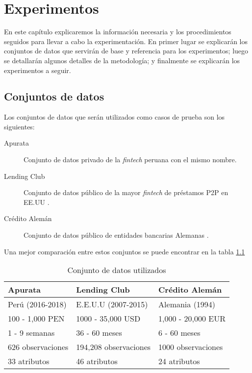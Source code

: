 \chapter{Experimentos}


En este capítulo explicaremos la información necesaria y los procedimientos seguidos para llevar a cabo la experimentación. En primer lugar se explicarán los conjuntos de datos que servirán de base y referencia para los experimentos; luego se detallarán algunos detalles de la metodología; y finalmente se explicarán los experimentos a seguir.

\section{Conjuntos de datos}

Los conjuntos de datos que serán utilizados como casos de prueba son los siguientes:

\begin{description}
	\item[Apurata] Conjunto de datos privado de la \textit{fintech} peruana con el mismo nombre.
	\item[Lending Club] Conjunto de datos público de la mayor \textit{fintech} de préstamos \ac{P2P} en EE.UU \citep{dataset:lending-club}.
	\item[Crédito Alemán] Conjunto de datos público de entidades bancarias Alemanas \citep{dataset:german-credit}.
\end{description}

Una mejor comparación entre estos conjuntos se puede encontrar en la tabla \ref{tab:dataset-comparison}

\begin{table}
	\centering
	\caption{Conjunto de datos utilizados}
	\label{tab:dataset-comparison}
	\begin{tabular}{@{}lll@{}}
	\toprule
	\textbf{Apurata}	& \textbf{Lending Club}		& \textbf{Crédito Alemán}	\\
	\midrule
	Perú (2016-2018)	& E.E.U.U (2007-2015)		& Alemania (1994)			\\
	100 - 1,000 PEN		& 1000 - 35,000 USD			& 1,000 - 20,000 EUR		\\
	1 - 9 semanas		& 36 - 60 meses				& 6 - 60 meses				\\
	626 observaciones	& 194,208 observaciones		& 1000 observaciones		\\
	33 atributos		& 46 atributos				& 24 atributos				\\
	\bottomrule
	\end{tabular}
\end{table}

